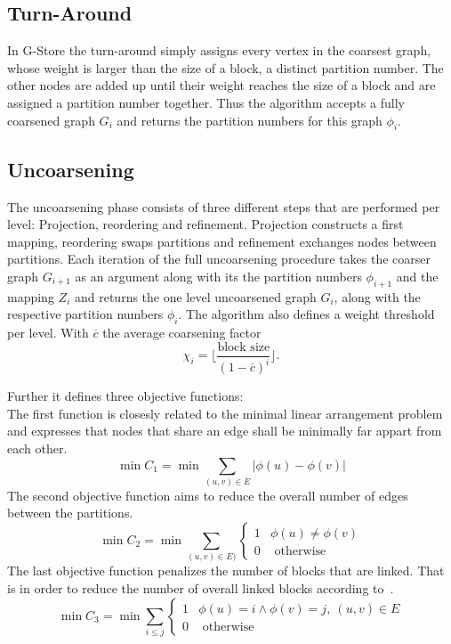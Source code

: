     \subsection{Turn-Around}\label{\positionnumber}
    In G-Store the turn-around simply assigns every vertex in the coarsest graph, whose weight is larger than the size of a block, a distinct partition number.
    The other nodes are added up until their weight reaches the size of a block and are assigned a partition number together.
    Thus the algorithm accepts a fully coarsened graph $G_i$ and returns the partition numbers for this graph $\phi_i$.

    
    \subsection{Uncoarsening}\label{\positionnumber}
    The uncoarsening phase consists of three different steps that are performed per level:
    Projection, reordering and refinement.
    Projection constructs a first mapping, reordering swaps partitions and refinement exchanges nodes between partitions.
    Each iteration of the full uncoarsening procedure takes the coarser graph $G_{i+1}$ as an argument along with its the partition numbers $\phi_{i+1}$ and the mapping $Z_{i}$ and returns the one level uncoarsened graph $G_i$, along with the respective partition numbers $\phi_i$.
    The algorithm also defines a weight threshold per level. With $\overline{c}$ the average coarsening factor
    \[ \chi_i = \lfloor \frac{\text{block size}}{(1-\overline{c})^i} \rfloor. \]
    
    Further it defines three objective functions:\\
    The first function is closesly related to the minimal linear arrangement problem~\autocite{lewis1983computers} and expresses that nodes that share an edge shall be minimally far appart from each other.
    \[ \min C_1 = \min \sum_{(u,v) \in E} |\phi(u) - \phi(v)| \]
    The second objective function aims to reduce the overall number of edges between the partitions.
    \[\min C_2 = \min \sum_{(u,v) \in E)} \begin{cases}
        1 & \phi(u) \neq \phi(v) \\
        0 & \text{ otherwise}
    \end{cases}
\]
    The last objective function penalizes the number of blocks that are linked. That is in order to reduce the number of overall linked blocks according to~\autocite{steinhaus2010g}.
    \[ \min C_3 = \min \sum_{i \leq j} 
    \begin{cases}
        1 & \phi(u) = i \wedge \phi(v) = j, \ (u,v) \in E \\
        0 & \text{ otherwise}
    \end{cases}
    \]
    
